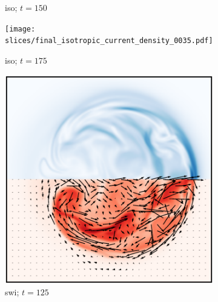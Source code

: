 \begin{figure}[t]
\begin{subfigure}[t]{0.32\textwidth}
    \caption{iso; $t=150$}
    \label{fig:final_isotropic_current_density_0030}
  \end{subfigure}
  \hfill
  \begin{subfigure}[t]{0.32\textwidth}
    \centering
    \texttt{[image: slices/final\_isotropic\_current\_density\_0035.pdf]}
    \caption{iso; $t=175$}
    \label{fig:final_isotropic_current_density_0035}
  \end{subfigure}
  \hfill
  \begin{subfigure}[t]{0.32\textwidth}
    \centering
    \includegraphics[width=\linewidth]{slices/final_switching_current_density_0025.pdf}
    \caption{swi; $t=125$}
    \label{fig:final_switching_current_density_0025}
  \end{subfigure}
  \hfill
  \begin{subfigure}[t]{0.32\textwidth}
    \centering

\end{subfigure}
\end{figure}
